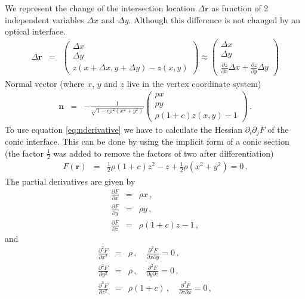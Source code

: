 \documentclass[12pt,a4paper,twoside,openright,BCOR10mm,headsepline,titlepage,abstracton,chapterprefix,final]{scrreprt}
\newcommand\Vector[1]{{\mathbf{#1}}}
\begin{document}
We represent the change of the intersection location $\Delta\Vector{r}$ as function of 2 independent variables $\Delta x$ and $\Delta y$.
Although this difference is not changed by an optical interface.
\begin{eqnarray}
 \Delta\Vector{r} &=&
 \begin{pmatrix}
  \Delta x \\ \Delta y \\ z(x+\Delta x,y+\Delta y) - z(x,y)
 \end{pmatrix}
 \approx 
 \begin{pmatrix}
  \Delta x \\ \Delta y \\ \frac{\partial z}{\partial x} \Delta x + \frac{\partial z}{\partial y} \Delta y
 \end{pmatrix}
\end{eqnarray}
Normal vector (where $x$, $y$ and $z$ live in the vertex coordinate system)
\begin{eqnarray}
 \Vector{n} &=&- \frac{1}{\sqrt{ 1 - c \rho^2 (x^2 + y^2)}} 
  \begin{pmatrix}
   \rho x \\
   \rho y \\
   \rho ( 1 + c ) z(x,y) - 1
  \end{pmatrix}\,.
\end{eqnarray}
To use equation \eqref{eq:nderivative} we have to calculate the Hessian $\partial_i \partial_j F$ of the conic interface.
This can be done by using the implicit form of a conic section (the factor $\tfrac{1}{2}$ was added to remove the factors of two after
differentiation)
\begin{eqnarray}
 F(\Vector{r}) &=& \frac{1}{2}\rho (1+c) z^2 - z + \frac{1}{2} \rho(x^2 + y^2) = 0\,.
\end{eqnarray}
The partial derivatives are given by
\begin{eqnarray}
 \frac{\partial F}{\partial x} &=& \rho x\,,\\
 \frac{\partial F}{\partial y} &=& \rho y\,,\\
 \frac{\partial F}{\partial z} &=& \rho (1+c) z - 1\,,
\end{eqnarray}
and
\begin{eqnarray}
 \frac{\partial^2 F}{\partial x^2} &=& \rho\,, \quad\frac{\partial^2 F}{\partial x \partial y} = 0\,,\\
 \frac{\partial^2 F}{\partial y^2} &=& \rho\,, \quad\frac{\partial^2 F}{\partial y \partial z} = 0\,,\\
 \frac{\partial^2 F}{\partial z^2} &=& \rho (1+c)\,, \quad\frac{\partial^2 F}{\partial z \partial x} = 0\,,
\end{eqnarray}
\end{document}
